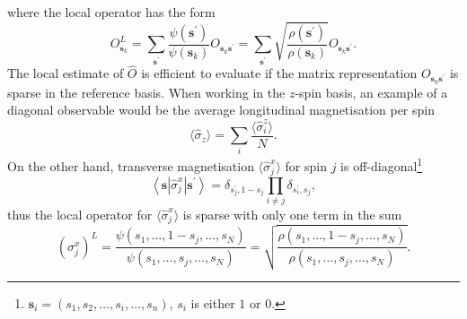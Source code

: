 where the local operator has the form
\begin{equation}
	O_{\boldsymbol{s}_{k}}^{L}=\sum_{\boldsymbol{s}^{\prime}} \frac{\psi(\boldsymbol{s}^{\prime})}{\psi\left(\boldsymbol{s}_{k}\right)} O_{\boldsymbol{s}_{k} \boldsymbol{s}^{\prime}} = \sum_{\boldsymbol{s}^{\prime}} \sqrt{\frac{\rho(\boldsymbol{s}^{\prime})}{\rho\left(\boldsymbol{s}_{k}\right)}} O_{\boldsymbol{s}_{k} \boldsymbol{s}^{\prime}}. 
\end{equation}
The local estimate of $\hat{O}$ is efficient to evaluate if the matrix representation $O_{\boldsymbol{s}_{k} \boldsymbol{s}^{\prime}}$ is sparse in the reference basis. When working in the $z$-spin basis, an example of a diagonal observable would be the average longitudinal magnetisation per spin 
\begin{equation}
	\langle \hat \sigma_z \rangle = \sum_i \frac{\langle \hat \sigma^z_{i} \rangle}{N}.
\end{equation}
On the other hand, transverse magnetisation $\langle \hat \sigma^x_j \rangle$ for spin $j$ is off-diagonal\footnote{$\boldsymbol{s}_i = (s_1, s_2, \ldots, s_i, \ldots, s_n)$, $s_i$ is either $1$ or $0$.}
\begin{equation}
	\left\langle\boldsymbol{s}\left|\hat{\sigma}_{j}^{x}\right| \boldsymbol{s}^{\prime}\right\rangle=\delta_{s_{j}^{\prime}, 1-s_{j}} \prod_{i \neq j} \delta_{s_{i}^{\prime}, s_{j}},
\end{equation}
thus the local operator for $\langle \hat \sigma^x_j \rangle$ is sparse with only one term in the sum
\begin{equation}
	\left(\sigma_{j}^{x}\right)^{L}=\frac{\psi \left(s_{1}, \ldots, 1-s_{j}, \ldots, s_{N}\right)}{\psi\left(s_{1}, \ldots, s_{j}, \ldots, s_{N}\right)}=\sqrt{\frac{\rho \left(s_{1}, \ldots, 1-s_{j}, \ldots, s_{N}\right)}{\rho\left(s_{1}, \ldots, s_{j}, \ldots, s_{N}\right)}}.
\end{equation}

